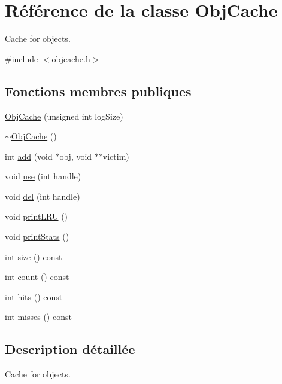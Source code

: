 \hypertarget{class_obj_cache}{}\section{Référence de la classe Obj\+Cache}
\label{class_obj_cache}


Cache for objects.  




{\ttfamily \#include $<$objcache.\+h$>$}

\subsection*{Fonctions membres publiques}
\begin{DoxyCompactItemize}
\item 
\hyperlink{class_obj_cache_a1818fcc2b39a5c54a6e2bd9b456b7ccb}{Obj\+Cache} (unsigned int log\+Size)
\item 
\hyperlink{class_obj_cache_ae2ea95b2c63b154dd0a068613ba06aff}{$\sim$\+Obj\+Cache} ()
\item 
int \hyperlink{class_obj_cache_affd025326493c40ac4e7f5b4c0c3ad9b}{add} (void $\ast$obj, void $\ast$$\ast$victim)
\item 
void \hyperlink{class_obj_cache_ac4d9eb810e8f6ca2fbd4cf058ff3fe0e}{use} (int handle)
\item 
void \hyperlink{class_obj_cache_a3ac1ae674ea8ff27e436c788f851d303}{del} (int handle)
\item 
void \hyperlink{class_obj_cache_aeea7452ce80751d3f8e76038dc44decc}{print\+L\+R\+U} ()
\item 
void \hyperlink{class_obj_cache_a3e4ded7d3342fb02d64bd8d39466a30a}{print\+Stats} ()
\item 
int \hyperlink{class_obj_cache_afe1e73a159e54fdc55076fc0670c13ab}{size} () const 
\item 
int \hyperlink{class_obj_cache_a583b92b08b3d1d55e12fd0b331100910}{count} () const 
\item 
int \hyperlink{class_obj_cache_a6169460988e7f843f4e7ee769d251652}{hits} () const 
\item 
int \hyperlink{class_obj_cache_a5a0a344135b23e0ad7044573e0a2d369}{misses} () const 
\end{DoxyCompactItemize}


\subsection{Description détaillée}
Cache for objects. 


